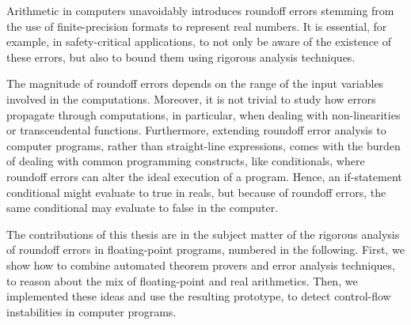 %

Arithmetic in computers unavoidably introduces roundoff errors stemming from the use of finite-precision formats to represent real numbers.
%
It is essential, for example, in safety-critical applications, to not only be aware of the existence of these errors, but also to bound them using rigorous analysis techniques.
%
%

%
The magnitude of roundoff errors depends on the range of the input variables involved in the computations.
%
Moreover, it is not trivial to study how errors propagate through computations, in particular, when dealing with non-linearities or transcendental functions.
%
Furthermore, extending roundoff error analysis to computer programs, rather than straight-line expressions, comes with the burden of dealing with common programming constructs, like conditionals, where roundoff errors can alter the ideal execution of a program. 
%
Hence, an if-statement conditional might evaluate to true in reals, but because of roundoff errors, the same conditional may evaluate to false in the computer. 
%
%
%
%
%

The contributions of this thesis are in the subject matter of the rigorous analysis of roundoff errors in floating-point programs, numbered in the following.
%
First, we show how to combine automated theorem provers and error analysis techniques, to reason about the mix of floating-point and real arithmetics.
%
Then, we implemented these ideas and use the resulting prototype, to detect control-flow instabilities in computer programs.
%

